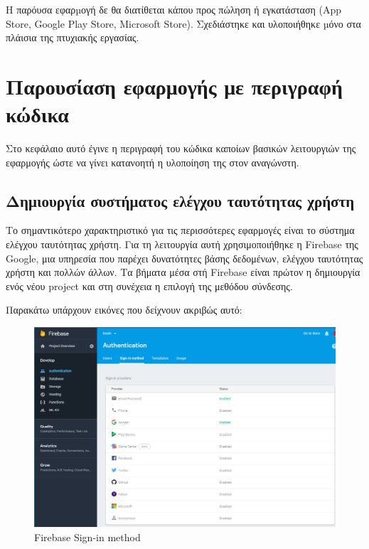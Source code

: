 \documentclass[a4paper,12pt]{article}
\begin{document}
		Η παρόυσα εφαρµογή δε θα διατίθεται κάπου προς πώληση ή εγκατάσταση (App Store, Google Play Store, Microsoft Store).
		Σχεδιάστηκε και υλοποιήθηκε µόνο στα πλάισια της πτυχιακής εργασίας. 
		\newpage
		\section{Παρουσίαση εφαρμογής με περιγραφή κώδικα}
			Στο κεφάλαιο αυτό έγινε η περιγραφή του κώδικα καποίων βασικών λειτουργιών της εφαρμογής ώστε να γίνει κατανοητή η υλοποίηση της στον αναγώνστη.
			\subsection{Δημιουργία συστήματος ελέγχου ταυτότητας χρήστη}

				Το σημαντικότερο χαρακτηριστικό για τις περισσότερες εφαρμογές είναι το σύστημα ελέγχου ταυτότητας χρήστη. Για τη λειτουργία αυτή χρησιμοποιήθηκε 
				η Firebase της Google, μια υπηρεσία που παρέχει δυνατότητες βάσης δεδομένων, ελέγχου ταυτότητας χρήστη και πολλών άλλων. 
				Τα βήματα μέσα στή Firebase είναι πρώτον η δημιουργία ενός νέου project και στη συνέχεια η επιλογή της μεθόδου σύνδεσης.
				
				Παρακάτω υπάρχουν εικόνες που δείχνουν ακριβώς αυτό:

				\vspace*{1cm}

			\begin{figure}[!htb]
				\begin{center}
					\caption{Firebase Sign-in method}
					\vspace*{0.5cm}

					\includegraphics[width=0.9\linewidth]{auth} 
				\end{center}
			\end{figure}
\end{document}
